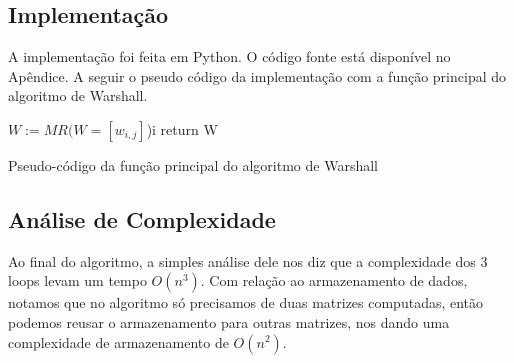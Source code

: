 \documentclass[a4paper,12pt]{article}
\begin{document}
\subsection{Implementação}

A implementação foi feita em Python. O código fonte está disponível no Apêndice. A seguir o pseudo código da implementação com a função principal do algoritmo de Warshall.

\begin{algorithm}[H]
$W := MR( W = [w_{i,j}] $)i
return W\;
\caption {Pseudo-código da função principal do algoritmo de Warshall}
\end{algorithm}


\subsection{Análise de Complexidade}

Ao final do algoritmo, a simples análise dele nos diz que a complexidade dos 3 loops levam um tempo $O(n^3)$. Com relação ao armazenamento de dados, notamos que no algoritmo só precisamos de duas matrizes computadas, então podemos reusar o armazenamento para outras matrizes, nos dando uma complexidade de armazenamento de $O(n^2)$.
\end{document}
